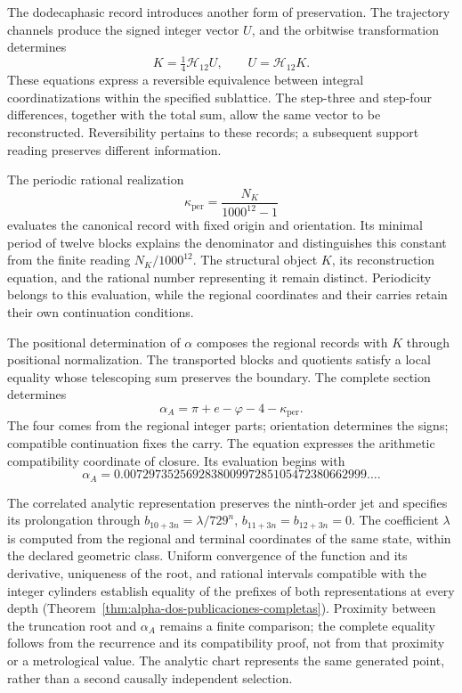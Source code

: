 The dodecaphasic record introduces another form of preservation. The trajectory channels produce the signed integer vector \(U\), and the orbitwise transformation determines
\[
 K=\tfrac14\mathcal H_{12}U,\qquad U=\mathcal H_{12}K.
\]
These equations express a reversible equivalence between integral coordinatizations within the specified sublattice. The step-three and step-four differences, together with the total sum, allow the same vector to be reconstructed. Reversibility pertains to these records; a subsequent support reading preserves different information.

The periodic rational realization
\[
 \kappa_{\mathrm{per}}=\frac{N_K}{1000^{12}-1}
\]
evaluates the canonical record with fixed origin and orientation. Its minimal period of twelve blocks explains the denominator and distinguishes this constant from the finite reading \(N_K/1000^{12}\). The structural object \(K\), its reconstruction equation, and the rational number representing it remain distinct. Periodicity belongs to this evaluation, while the regional coordinates and their carries retain their own continuation conditions.

The positional determination of \(\alpha\) composes the regional records with \(K\) through positional normalization. The transported blocks and quotients satisfy a local equality whose telescoping sum preserves the boundary. The complete section determines
\[
 \alpha_A=\pi+e-\varphi-4-\kappa_{\mathrm{per}}.
\]
The four comes from the regional integer parts; orientation determines the signs; compatible continuation fixes the carry. The equation expresses the arithmetic compatibility coordinate of closure. Its evaluation begins with
\[
 \alpha_A=0.007297352569283800997285105472380662999\ldots.
\]

The correlated analytic representation preserves the ninth-order jet
and specifies its prolongation through
\(b_{10+3n}=\lambda/729^n\), \(b_{11+3n}=b_{12+3n}=0\).
The coefficient \(\lambda\) is computed from the regional and terminal
coordinates of the same state, within the declared geometric class.
Uniform convergence of the function and its derivative, uniqueness of
the root, and rational intervals compatible with the integer cylinders
establish equality of the prefixes of both representations at every depth
(Theorem~\ref{thm:alpha-dos-publicaciones-completas}). Proximity between
the truncation root and \(\alpha_A\) remains a finite comparison;
the complete equality follows from the recurrence and its compatibility
proof, not from that proximity or a metrological value.
The analytic chart represents the same generated point,
rather than a second causally independent selection.

